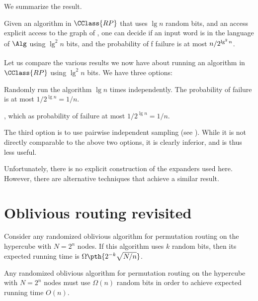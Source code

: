 We summarize the result.
\begin{lemma}
    Given an algorithm \Alg in $\CClass{RP}$ that uses $\lg n$ random
    bits, and an access explicit access to the graph of
    , one can decide if an input word is in the
    language of $\Alg$ using $\lg^2n$ bits, and the probability of f
    failure is at most $\Bigl.{n}/{2^{\lg^2 n }}$.
\end{lemma}

Let us compare the various results we now have about running an
algorithm in $\CClass{RP}$ using $\lg^2 n$ bits. We have three
options:
\begin{compactenumA}
    \item Randomly run the algorithm $\lg n$ times independently. The
    probability of failure is at most $1/2^{\lg n} = 1/n$.

    \item {}, which as probability of failure at
    most $1/2^{\lg n} = 1/n$.

    \item The third option is to use pairwise independent sampling
    (see ). While it is not directly comparable
    to the above two options, it is clearly inferior, and is thus less
    useful.

\end{compactenumA}
\bigskip


Unfortunately, there is no explicit construction of the expanders used
here. However, there are alternative techniques that achieve a similar
result.



\section{Oblivious routing revisited}

\begin{theorem}
    Consider any randomized oblivious algorithm for permutation
    routing on the hypercube with $N=2^n$ nodes. If this algorithm
    uses $k$ random bits, then its expected running time is $\Omega
    \pth{ 2^{-k} \sqrt{N/n} }$.
\end{theorem}

\begin{corollary}
    Any randomized oblivious algorithm for permutation routing on the
    hypercube with $N=2^n$ nodes must use $\Omega(n)$ random bits in
    order to achieve expected running time $O(n)$.
\end{corollary}


